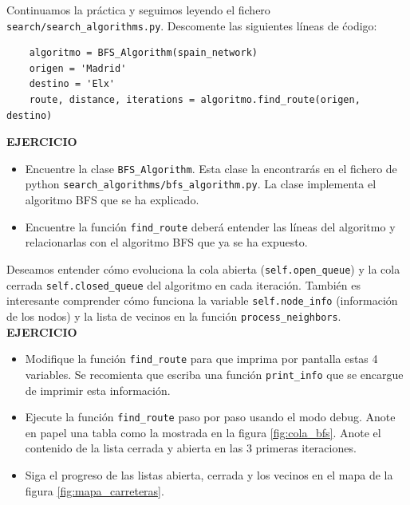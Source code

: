 \documentclass{article}
\begin{document}
\begin{exercise}
Continuamos la práctica y seguimos leyendo el fichero \texttt{search/search\_algorithms.py}. Descomente las siguientes líneas de ćodigo:
\begin{verbatim}
    algoritmo = BFS_Algorithm(spain_network)
    origen = 'Madrid'
    destino = 'Elx'
    route, distance, iterations = algoritmo.find_route(origen, destino)
\end{verbatim}


\textbf{EJERCICIO}\\
\begin{itemize}
    \item Encuentre la clase \texttt{BFS\_Algorithm}. Esta clase la encontrarás en el fichero de python \texttt{search\_algorithms/bfs\_algorithm.py}. La clase implementa el algoritmo BFS que se ha explicado.
    \item Encuentre la función \texttt{find\_route} deberá entender las líneas del algoritmo y relacionarlas con el algoritmo BFS que ya se ha expuesto.
\end{itemize}
\end{exercise}

\begin{exercise}
Deseamos entender cómo evoluciona la cola abierta (\texttt{self.open\_queue}) y la cola cerrada \texttt{self.closed\_queue} del algoritmo en cada iteración. También es interesante comprender cómo funciona la variable \texttt{self.node\_info} (información de los nodos) y la lista de vecinos en la función \texttt{process\_neighbors}.\\

\textbf{EJERCICIO}\\
\begin{itemize}
    \item[a)] Modifique la función \texttt{find\_route} para que imprima por pantalla estas 4 variables. Se recomienta que escriba una función \texttt{print\_info} que se encargue de imprimir esta información.
    \item[b)] Ejecute la función \texttt{find\_route} paso por paso usando el modo debug. Anote en papel una tabla como la mostrada en la figura \ref{fig:cola_bfs}. Anote el contenido de la lista cerrada y abierta en las 3 primeras iteraciones.
    \item[c)] Siga el progreso de las listas abierta, cerrada y los vecinos en el mapa de la figura \ref{fig:mapa_carreteras}.
\end{itemize}    
\end{exercise}
\end{document}
